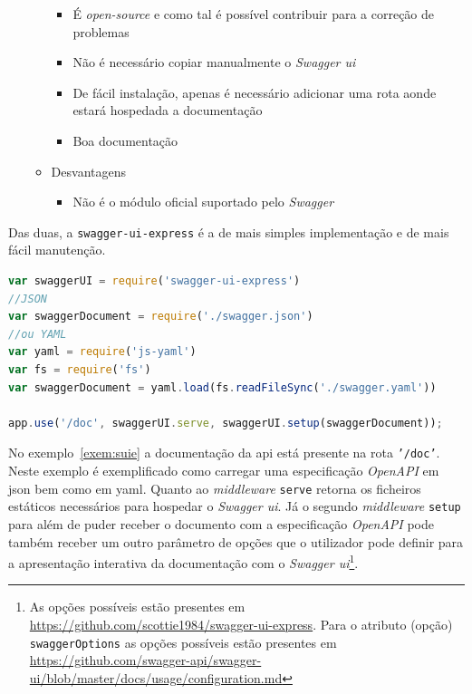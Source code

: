 \begin{itemize}
\begin{itemize}
        \begin{itemize}
            \item É \textit{open-source} e como tal é possível contribuir para a correção de problemas
            \item Não é necessário copiar manualmente o \textit{Swagger \acrshort{ui}}
            \item De fácil instalação, apenas é necessário adicionar uma rota aonde estará hospedada a documentação
            \item Boa documentação
        \end{itemize}
        \item Desvantagens
        \begin{itemize}
            \item Não é o módulo oficial suportado pelo \textit{Swagger}
        \end{itemize}
    \end{itemize}
\end{itemize}

Das duas, a \texttt{swagger-ui-express} é a de mais simples implementação e de mais fácil manutenção.

\begin{lstlisting}[language=javascript, caption=Exemplo de uso do \texttt{swagger-ui-express}, label=exem:suie]
var swaggerUI = require('swagger-ui-express')
//JSON
var swaggerDocument = require('./swagger.json')
//ou YAML
var yaml = require('js-yaml')
var fs = require('fs')
var swaggerDocument = yaml.load(fs.readFileSync('./swagger.yaml'))

app.use('/doc', swaggerUI.serve, swaggerUI.setup(swaggerDocument));
\end{lstlisting}

No exemplo~\ref{exem:suie} a documentação da \acrshort{api} está presente na rota \texttt{'/doc'}. Neste exemplo é exemplificado como carregar uma especificação \textit{OpenAPI} em \acrshort{json} bem como em \acrshort{yaml}. Quanto ao \textit{middleware} \texttt{serve} retorna os ficheiros estáticos necessários para hospedar o \textit{Swagger \acrshort{ui}}. Já o segundo \textit{middleware} \texttt{setup} para além de puder receber o documento com a especificação \textit{OpenAPI} pode também receber um outro parâmetro de opções que o utilizador pode definir para a apresentação interativa da documentação com o \textit{Swagger \acrshort{ui}}\footnote{As opções possíveis estão presentes em \url{https://github.com/scottie1984/swagger-ui-express}. Para o atributo (opção) \texttt{swaggerOptions} as opções possíveis estão presentes em \url{https://github.com/swagger-api/swagger-ui/blob/master/docs/usage/configuration.md}}.

